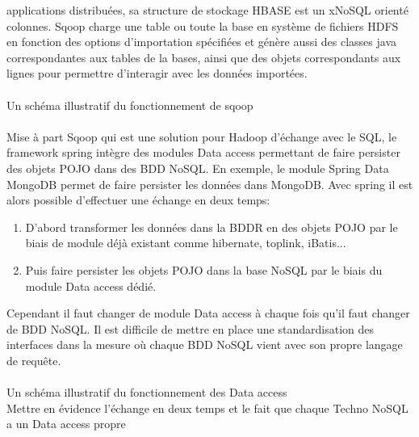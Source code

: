 applications distribuées, sa structure de stockage \textsf{HBASE} est
un x\textsf{NoSQL} orienté colonnes. \textsf{Sqoop} charge
une table ou toute la base en système de fichiers \textsf{HDFS} en
fonction des options d'importation spécifiées et génère aussi des
classes \textsf{java} correspondantes aux tables de la bases, ainsi
que des objets correspondants aux lignes pour permettre d'interagir
avec les données importées.
\\
\\
{\color{red} Un schéma illustratif du fonctionnement de sqoop}
\\
\\
Mise à part \textsf{Sqoop} qui est une solution pour \textsf{Hadoop}
d'échange avec le \textsf{SQL}, le framework
\textsf{spring} intègre des modules \textsf{Data access}\cite{springsource} permettant 
de faire persister des objets \textsf{POJO} dans des \textsf{BDD NoSQL}. En
exemple, le module \textsf{Spring Data MongoDB} permet de faire persister
les données dans \textsf{MongoDB}. Avec \textsf{spring} il est alors possible
d'effectuer une échange en deux temps:
\begin{enumerate}
\item D'abord transformer les données dans la \textsf{BDDR} en des objets 
      \textsf{POJO} par le biais de module déjà existant
      comme \textsf{hibernate, toplink, iBatis}...
\item Puis faire persister les objets \textsf{POJO} dans la base \textsf{NoSQL} par le biais du module 
      \textsf{Data access} dédié.    
\end{enumerate} 
Cependant il faut changer de module \textsf{Data access} à chaque fois
qu'il faut changer de \textsf{BDD NoSQL}. Il est difficile de mettre
en place une standardisation des interfaces dans la mesure où
chaque \textsf{BDD NoSQL} vient avec son propre langage de requête.
\\
\\
{\color{red} Un schéma illustratif du fonctionnement des \textsf{Data access}
\\
Mettre en évidence l'échange en deux temps et le fait que chaque \textsf{Techno NoSQL} a un \textsf{Data access} propre}
